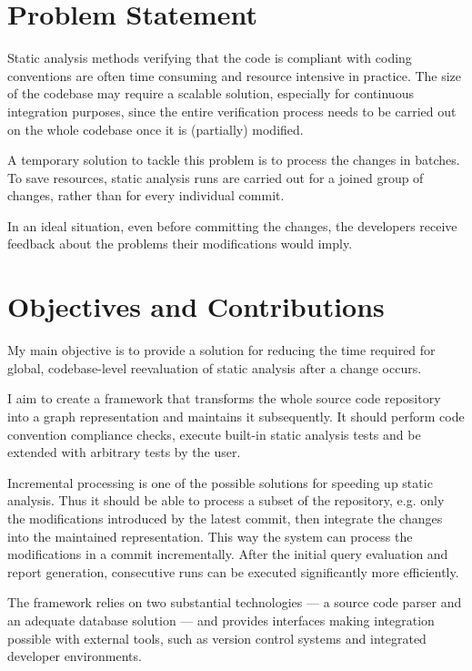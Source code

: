 \section{Problem Statement}

Static analysis methods verifying that the code is compliant with coding conventions are often time consuming and resource intensive in practice. The size of the codebase may require a scalable solution, especially for continuous integration purposes, since the entire verification process needs to be carried out on the whole codebase once it is (partially) modified.

A temporary solution to tackle this problem is to process the changes in batches. To save resources, static analysis runs are carried out for a joined group of changes, rather than for every individual commit.

In an ideal situation, even before committing the changes, the developers receive feedback about the problems their modifications would imply.


\section{Objectives and Contributions}

My main objective is to provide a solution for reducing the time required for global, codebase-level reevaluation of static analysis after a change occurs.

I aim to create a framework that transforms the whole source code repository into a graph representation and maintains it subsequently. It should perform code convention compliance checks, execute built-in static analysis tests and be extended with arbitrary tests by the user.

Incremental processing is one of the possible solutions for speeding up static analysis. Thus it should be able to process a subset of the repository, e.g. only the modifications introduced by the latest commit, then integrate the changes into the maintained representation. This way the system can process the modifications in a commit incrementally. After the initial query evaluation and report generation, consecutive runs can be executed significantly more efficiently.

The framework relies on two substantial technologies --- a source code parser and an adequate database solution --- and provides interfaces making integration possible with external tools, such as version control systems and integrated developer environments.


